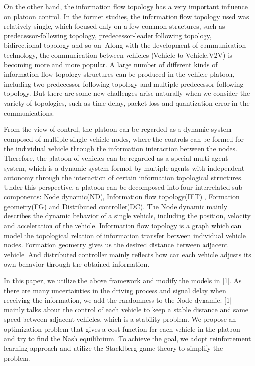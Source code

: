 \documentclass{article}
\begin{document}
On the other hand, the information flow topology has a very important influence on platoon control. In the former studies, the information flow topology used was relatively single, which focused only on a few common structures, such as predecessor-following topology, predecessor-leader following topology, bidirectional topology and so on.  Along with the development of communication technology, the communication between vehicles (Vehicle-to-Vehicle,V2V) is becoming more and more popular. A large number of different kinds of information flow topology structures can be produced in the vehicle platoon, including two-predecessor following topology and multiple-predecessor following topology. But there are some new challenges arise naturally when we consider the variety of topologies, such as time delay, packet loss and quantization error in the communications.

From the view of control, the platoon can be regarded as a dynamic system composed of multiple single vehicle nodes, where the controls can be formed for the individual vehicle through the information interaction between the nodes. Therefore, the platoon of vehicles can be 
regarded as a special multi-agent system, which is a dynamic system formed by multiple agents with independent autonomy through the interaction of certain information topological structures. Under this perspective, a platoon can be decomposed into four interrelated sub-components: Node dynamic(ND), Information flow topology(IFT) , Formation geometry(FG) and Distributed controller(DC). The Node dynamic mainly describes the dynamic behavior of a single vehicle, including the position, velocity and acceleration of the vehicle.  Information flow topology is a graph which can model the topological relation of information transfer between individual vehicle nodes. Formation geometry gives us the desired distance between adjacent vehicle. And distributed controller mainly reflects how can each vehicle adjusts its own behavior through the obtained information.

In this paper, we utilize the above framework and modify the models in [1]. As there are many uncertainties in the driving process and signal delay when receiving the information, we add the randomness to the Node dynamic. [1] mainly talks about the control of each vehicle to keep a stable distance and same speed between adjacent vehicles, which is a stability problem. We propose an optimization problem that gives a cost function for each vehicle in the platoon and try to find the Nash equilibrium. To achieve the goal, we adopt reinforcement learning approach and utilize the Stacklberg game theory to simplify the problem.
\end{document}
